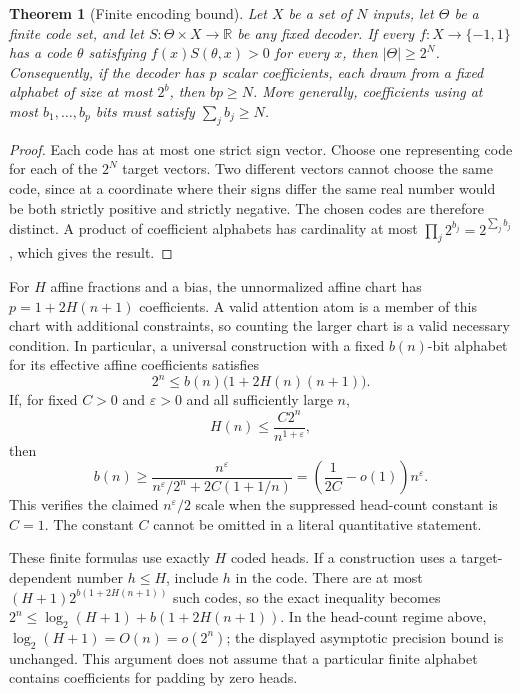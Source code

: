 \documentclass[11pt]{article}
\newtheorem{theorem}{Theorem}
\begin{document}
\begin{theorem}[Finite encoding bound]
Let $X$ be a set of $N$ inputs, let $\Theta$ be a finite code set,
and let $S:\Theta\times X\to\mathbb R$ be any fixed decoder.
If every $f:X\to\{-1,1\}$ has a code $\theta$ satisfying
$f(x)S(\theta,x)>0$ for every $x$, then $|\Theta|\ge 2^N$.
Consequently, if the decoder has $p$ scalar coefficients, each drawn
from a fixed alphabet of size at most $2^b$, then $bp\ge N$.
More generally, coefficients using at most $b_1,\ldots,b_p$ bits
must satisfy $\sum_j b_j\ge N$.
\end{theorem}
\begin{proof}
Each code has at most one strict sign vector. Choose one representing
code for each of the $2^N$ target vectors. Two different vectors cannot
choose the same code, since at a coordinate where their signs differ
the same real number would be both strictly positive and strictly
negative. The chosen codes are therefore distinct. A product of
coefficient alphabets has cardinality at most
$\prod_j 2^{b_j}=2^{\sum_j b_j}$, which gives the result.
\end{proof}

For $H$ affine fractions and a bias, the unnormalized affine chart
has $p=1+2H(n+1)$ coefficients. A valid attention atom is a member of
this chart with additional constraints, so counting the larger chart
is a valid necessary condition. In particular, a universal construction
with a fixed $b(n)$-bit alphabet for its effective affine coefficients
satisfies
\[
  2^n\le b(n)\bigl(1+2H(n)(n+1)\bigr).
\]
If, for fixed $C>0$ and $\varepsilon>0$ and all sufficiently large $n$,
\[
  H(n)\le \frac{C2^n}{n^{1+\varepsilon}},
\]
then
\[
 b(n)\ge
 \frac{n^\varepsilon}
 {n^\varepsilon/2^n+2C(1+1/n)}
 =\left(\frac{1}{2C}-o(1)\right)n^\varepsilon.
\]
This verifies the claimed $n^\varepsilon/2$ scale when the suppressed
head-count constant is $C=1$. The constant $C$ cannot be omitted in a
literal quantitative statement.

These finite formulas use exactly $H$ coded heads. If a construction
uses a target-dependent number $h\le H$, include $h$ in the code.
There are at most $(H+1)2^{b(1+2H(n+1))}$ such codes, so the exact
inequality becomes
$2^n\le\log_2(H+1)+b(1+2H(n+1))$. In the head-count regime above,
$\log_2(H+1)=O(n)=o(2^n)$; the displayed asymptotic precision bound
is unchanged. This argument does not assume that a particular finite
alphabet contains coefficients for padding by zero heads.
\end{document}
